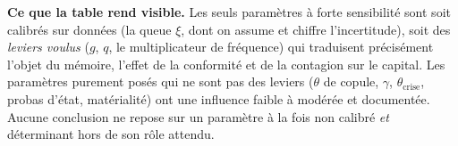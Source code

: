 \vspace{4pt}

\textbf{Ce que la table rend visible.} Les seuls paramètres à forte sensibilité sont
soit calibrés sur données (la queue $\xi$, dont on assume et chiffre l'incertitude), soit des
\emph{leviers voulus} ($g$, $q$, le multiplicateur de fréquence) qui traduisent précisément l'objet du mémoire, l'effet de
la conformité et de la contagion sur le capital. Les paramètres purement posés qui
ne sont pas des leviers ($\theta$ de copule, $\gamma$, $\theta_{\text{crise}}$, probas d'état,
matérialité) ont une influence faible à modérée et documentée. Aucune conclusion ne
repose sur un paramètre à la fois non calibré \emph{et} déterminant hors de son rôle attendu.
